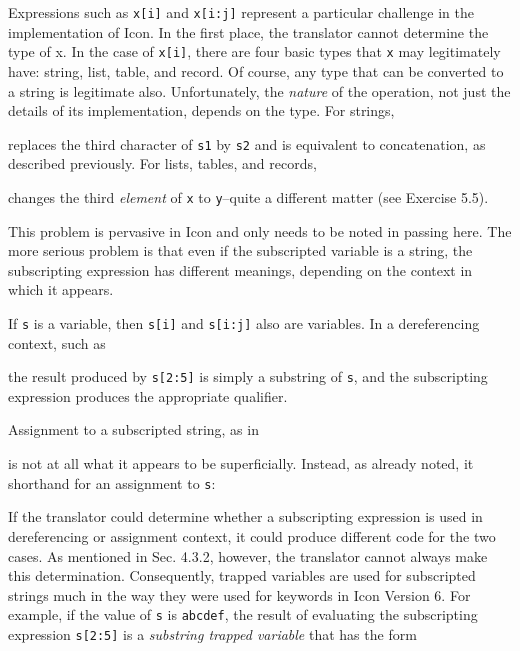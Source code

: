 Expressions such as \texttt{x[i]} and \texttt{x[i:j]} represent a
particular challenge in the implementation of Icon. In the first
place, the translator cannot determine the type of x. In the case of
\texttt{x[i]}, there are four basic types that \texttt{x} may
legitimately have: string, list, table, and record. Of course, any
type that can be converted to a string is legitimate
also. Unfortunately, the \textit{nature }of the operation, not just
the details of its implementation, depends on the type. For strings,


\noindent replaces the third character of \texttt{s1} by \texttt{s2}
and is equivalent to concatenation, as described previously.  For
lists, tables, and records,


\noindent changes the third \textit{element }of \texttt{x} to
\texttt{y}{}--quite a different matter (see Exercise 5.5).

This problem is pervasive in Icon and only needs to be noted in
passing here. The more serious problem is that even if the subscripted
variable is a string, the subscripting expression has different
meanings, depending on the context in which it appears.

If \texttt{s} is a variable, then \texttt{s[i]} and \texttt{s[i:j]}
also are variables. In a dereferencing context, such as


\noindent the result produced by \texttt{s[2:5]} is simply a substring
of \texttt{s}, and the subscripting expression produces the
appropriate qualifier.

Assignment to a subscripted string, as in


\noindent is not at all what it appears to be superficially. Instead,
as already noted, it shorthand for an assignment to \texttt{s}:


If the translator could determine whether a subscripting expression is
used in dereferencing or assignment context, it could produce
different code for the two cases. As mentioned in Sec. 4.3.2, however,
the translator cannot always make this determination. Consequently,
trapped variables are used for subscripted strings much in the way they
were used for keywords in Icon Version 6. For example, if the value of \texttt{s} is
\texttt{{\textquotedbl}abcdef{\textquotedbl}}, the result of
evaluating the subscripting expression \texttt{s[2:5]} is a
\textit{substring trapped variable} that has the form

